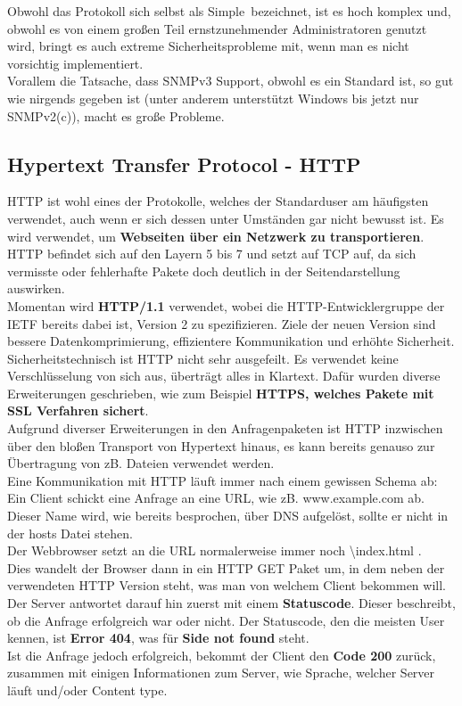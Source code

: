 \documentclass[12pt,a4paper]{report}
\begin{document}
\begin{onehalfspace}
Obwohl das Protokoll sich selbst als \glqq Simple\grqq \ bezeichnet, ist es hoch komplex und, obwohl es von einem großen Teil ernstzunehmender Administratoren genutzt wird, bringt es auch extreme Sicherheitsprobleme mit, wenn man es nicht vorsichtig implementiert.\\
Vorallem die Tatsache, dass SNMPv3 Support, obwohl es ein Standard ist, so gut wie nirgends gegeben ist (unter anderem unterstützt Windows bis jetzt nur SNMPv2(c)), macht es große Probleme. 
\subsection{Hypertext Transfer Protocol - HTTP}
HTTP ist wohl eines der Protokolle, welches der Standarduser am häufigsten verwendet, auch wenn er sich dessen unter Umständen gar nicht bewusst ist. Es wird verwendet, um \textbf{Webseiten über ein Netzwerk zu transportieren}. HTTP befindet sich auf den Layern 5 bis 7 und setzt auf TCP auf, da sich vermisste oder fehlerhafte Pakete doch deutlich in der Seitendarstellung auswirken.\\
Momentan wird \textbf{HTTP/1.1} verwendet, wobei die HTTP-Entwicklergruppe der IETF bereits dabei ist, Version 2 zu spezifizieren. Ziele der neuen Version sind bessere Datenkomprimierung, effizientere Kommunikation und erhöhte Sicherheit.\\

Sicherheitstechnisch ist HTTP nicht sehr ausgefeilt. Es verwendet keine Verschlüsselung von sich aus, überträgt alles in Klartext. Dafür wurden diverse Erweiterungen geschrieben, wie zum Beispiel \textbf{HTTPS, welches Pakete mit SSL Verfahren sichert}.\\

Aufgrund diverser Erweiterungen in den Anfragenpaketen ist HTTP inzwischen über den bloßen Transport von Hypertext hinaus, es kann bereits genauso zur Übertragung von zB. Dateien verwendet werden.\\

Eine Kommunikation mit HTTP läuft immer nach einem gewissen Schema ab:\\
Ein Client schickt eine Anfrage an eine URL, wie zB. www.example.com ab. Dieser Name wird, wie bereits besprochen, über DNS aufgelöst, sollte er nicht in der hosts Datei stehen.\\
Der Webbrowser setzt an die URL normalerweise immer noch \glqq \textbackslash index.html \grqq .\\
Dies wandelt der Browser dann in ein HTTP GET Paket um, in dem neben der verwendeten HTTP Version steht, was man von welchem Client bekommen will.\\
Der Server antwortet darauf hin zuerst mit einem \textbf{Statuscode}. Dieser beschreibt, ob die Anfrage erfolgreich war oder nicht. Der Statuscode, den die meisten User kennen, ist \textbf{Error 404}, was für \textbf{Side not found} steht.\\
Ist die Anfrage jedoch erfolgreich, bekommt der Client den \textbf{Code 200} zurück, zusammen mit einigen Informationen zum Server, wie Sprache, welcher Server läuft und/oder Content type.

\end{onehalfspace}
\end{document}
